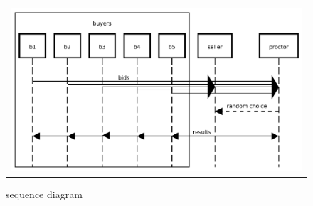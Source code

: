 \begin{figure}[tbhp]
  \begin{mdframed}
  \begin{tabular}{c}
  \begin{minipage}{13.5cm}
    \includegraphics[width=13.5cm]{exercise.pdf}
  \end{minipage}
  \end{tabular}
  \caption{sequence diagram}
  \label{fig:usability-exercise-diagram}
  \end{mdframed}
\end{figure}
